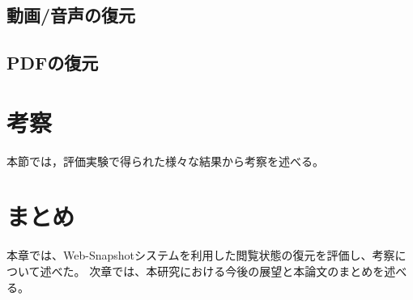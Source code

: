 \subsection{動画/音声の復元}

\subsection{PDFの復元}

\section{考察}
本節では，評価実験で得られた様々な結果から考察を述べる。

\section{まとめ}
本章では、Web-Snapshotシステムを利用した閲覧状態の復元を評価し、考察について述べた。
次章では、本研究における今後の展望と本論文のまとめを述べる。